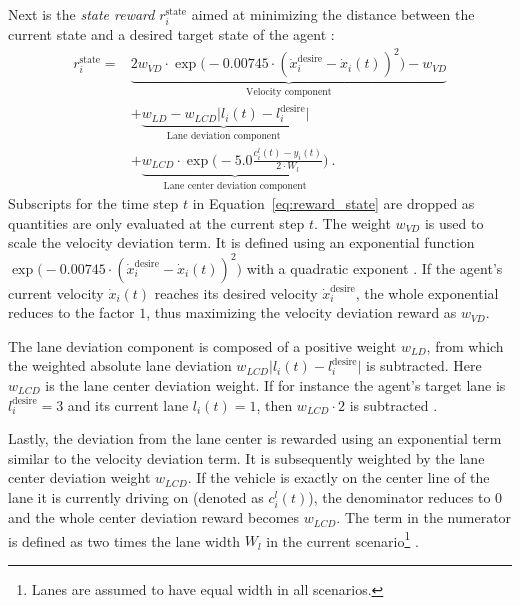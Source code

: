 Next is the \emph{state reward} $r_i^{\text{state}}$ aimed at minimizing the distance between the current state and a desired target state of the agent \cite{kurzerDecentralizedCooperativePlanning2018}:
\begin{align}\label{eq:reward_state}
    r_i^{\text{state}} = {} &  \underbrace{2 w_{VD} \cdot \exp \big(-0.00745 \cdot (\dot x_i^{\text{desire}} - \dot x_i(t))^2 \big) - w_{VD}}_\text{Velocity component} \nonumber \\
    & +  \underbrace{w_{LD} - w_{LCD} \big|l_i (t) - l_i^{\text{desire}}}_\text{Lane deviation component} \big|  \nonumber \\
    & + \underbrace{w_{LCD} \cdot \exp \Big(-5.0 \frac{c_i^l (t) -y_i(t)}{2 \cdot W_l} \Big)}_\text{Lane center deviation component}~.
\end{align}
Subscripts for the time step $t$ in Equation~\ref{eq:reward_state} are dropped as quantities are only evaluated at the current step $t$. The weight $w_{VD}$ is used to scale the velocity deviation term. It is defined using an exponential function $\exp \big(-0.00745 \cdot (\dot x_i^{\text{desire}} - \dot x_i(t))^2 \big)$ with a quadratic exponent \cite{kurzerDecentralizedCooperativePlanning2018}. If the agent's current velocity $\dot x_i(t)$ reaches its desired velocity $\dot x_i^{\text{desire}}$, the whole exponential reduces to the factor $1$, thus maximizing the velocity deviation reward as $w_{VD}$.

The lane deviation component is composed of a positive weight $w_{LD}$, from which the weighted absolute lane deviation $w_{LCD} \big|l_i (t) - l_i^{\text{desire}} \big|$ is subtracted. Here $w_{LCD}$ is the lane center deviation weight. If for instance the agent's target lane is $l_i^{\text{desire}} = 3$ and its current lane $l_i (t) = 1$, then $w_{LCD} \cdot 2$ is subtracted \cite{kurzerDecentralizedCooperativePlanning2018}.

Lastly, the deviation from the lane center is rewarded using an exponential term similar to the velocity deviation term. It is subsequently weighted by the lane center deviation weight $w_{LCD}$. If the vehicle is exactly on the center line of the lane it is currently driving on (denoted as $c_i^l (t)$), the denominator reduces to $0$ and the whole center deviation reward becomes $ w_{LCD}$. The term in the numerator is defined as two times the lane width $W_l$ in the current scenario\footnote{Lanes are assumed to have equal width in all scenarios.} \cite{kurzerDecentralizedCooperativePlanning2018}.

